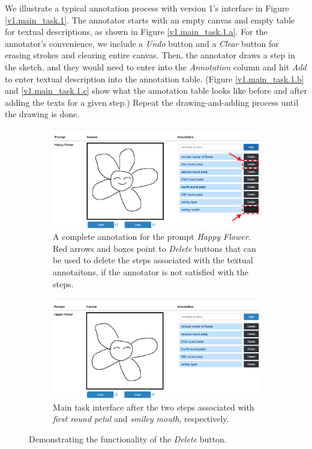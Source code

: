 We illustrate a typical annotation process with version 1's interface in Figure \ref{v1.main_task.1}. 
The annotator starts with an empty canvas and empty table for textual descriptions, as shown in Figure \ref{v1.main_task.1.a}. For the annotator's convenience, we include a \textit{Undo} button and a \textit{Clear} button for erasing strokes and clearing entire canvas.  
Then, the annotator draws a step in the sketch, and they would need to enter into the \textit{Annotation} column and hit \textit{Add} to enter textual description into the annotation table. (Figure \ref{v1.main_task.1.b} and \ref{v1.main_task.1.c} show what the annotation table looks like before and after adding the texts for a given step.)
Repeat the drawing-and-adding process until the drawing is done. 

\begin{figure}[!htb]
\begin{subfigure}{\textwidth}
    \centering
    \includegraphics[width=.8\linewidth]{data_collection/v1_before_delete.png}  
    \caption{A complete annotation for the prompt \textit{Happy Flower}. Red arrows and boxes point to \textit{Delete} buttons that can be used to delete the steps associated with the textual annotaitons, if the annotator is not satisfied with the steps.}
    \label{v1.main_task.delete.a}
\end{subfigure}
\newline
\begin{subfigure}{\textwidth}
    \centering
    \includegraphics[width=.8\linewidth]{data_collection/v1_after_delete.png}  
    \caption{Main task interface after the two steps associated with \textit{first round petal} and \textit{smiley mouth}, respectively.}
    \label{v1.main_task.delete.b}
\end{subfigure}
\caption{Demonstrating the functionality of the \textit{Delete} button.}
\label{v1.main_task.delete}
\end{figure}


